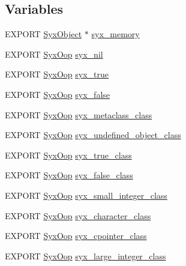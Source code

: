 \subsection*{Variables}
\begin{CompactItemize}
\item 
EXPORT \hyperlink{struct_syx_object}{SyxObject} $\ast$ \hyperlink{syx-object_8h_596eb1af08585a501808735d80503037}{syx\_\-memory}
\item 
EXPORT \hyperlink{syx-types_8h_1121caba2d40b2ce090b640762744ccd}{SyxOop} \hyperlink{syx-object_8h_099047c2766cf0dea30c046d58f6f64f}{syx\_\-nil}
\item 
EXPORT \hyperlink{syx-types_8h_1121caba2d40b2ce090b640762744ccd}{SyxOop} \hyperlink{syx-object_8h_ac2fe13e9bd66770ef58d98f2be8629d}{syx\_\-true}
\item 
EXPORT \hyperlink{syx-types_8h_1121caba2d40b2ce090b640762744ccd}{SyxOop} \hyperlink{syx-object_8h_d3170f4cecf092ffa04e6f55351d12d0}{syx\_\-false}
\item 
EXPORT \hyperlink{syx-types_8h_1121caba2d40b2ce090b640762744ccd}{SyxOop} \hyperlink{syx-object_8h_c9c6222aa1286578c4d077429047ca3e}{syx\_\-metaclass\_\-class}
\item 
EXPORT \hyperlink{syx-types_8h_1121caba2d40b2ce090b640762744ccd}{SyxOop} \hyperlink{syx-object_8h_f534222f282de18e7b7b70237afb235a}{syx\_\-undefined\_\-object\_\-class}
\item 
EXPORT \hyperlink{syx-types_8h_1121caba2d40b2ce090b640762744ccd}{SyxOop} \hyperlink{syx-object_8h_9b2ffeb8a5dee3abb1ae31543cea132f}{syx\_\-true\_\-class}
\item 
EXPORT \hyperlink{syx-types_8h_1121caba2d40b2ce090b640762744ccd}{SyxOop} \hyperlink{syx-object_8h_6bb55cfd100e1c3614b1a4f941c22f9d}{syx\_\-false\_\-class}
\item 
EXPORT \hyperlink{syx-types_8h_1121caba2d40b2ce090b640762744ccd}{SyxOop} \hyperlink{syx-object_8h_7a13d4490f4ea23e10b62c5795dbf71a}{syx\_\-small\_\-integer\_\-class}
\item 
EXPORT \hyperlink{syx-types_8h_1121caba2d40b2ce090b640762744ccd}{SyxOop} \hyperlink{syx-object_8h_0620595819b6972d75adf8c49cddfad9}{syx\_\-character\_\-class}
\item 
EXPORT \hyperlink{syx-types_8h_1121caba2d40b2ce090b640762744ccd}{SyxOop} \hyperlink{syx-object_8h_ae4d22bf2cfb62dc988be9f421e97aee}{syx\_\-cpointer\_\-class}
\item 
EXPORT \hyperlink{syx-types_8h_1121caba2d40b2ce090b640762744ccd}{SyxOop} \hyperlink{syx-object_8h_56d7e3f1e550bc346b3fd6cbcb31c6a2}{syx\_\-large\_\-integer\_\-class}

\end{CompactItemize}

